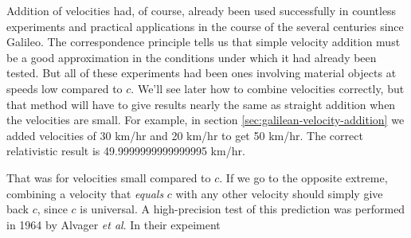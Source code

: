 Addition of velocities had, of course, already been used
successfully in countless experiments and practical applications in the course of the several
centuries since Galileo. The correspondence principle tells us that simple velocity addition
must be a good approximation in the conditions under which it had already been tested.
But all of these experiments had been ones involving material objects at speeds low compared
to $c$. We'll see later how to combine velocities correctly, but that method will have to give
results nearly the same as straight addition when the velocities are small. For example,
in section \ref{sec:galilean-velocity-addition} we added velocities of 30 km/hr and 20 km/hr
to get 50 km/hr. The correct relativistic result is 49.9999999999999995 km/hr.

That was for velocities small compared to $c$. If we go to the opposite extreme, combining
a velocity that \emph{equals} $c$ with any other velocity should simply give back $c$, since
$c$ is universal. A high-precision test of this prediction was performed in 1964 by Alv\:ager
\emph{et al}. In their expeiment

